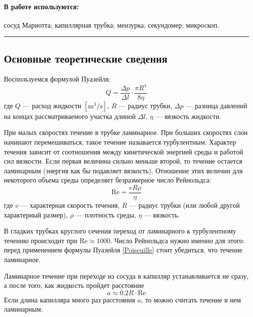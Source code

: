 \documentclass[a4paper,12pt]{report}
\newcommand{\re}{\text{Re}}
\begin{document}
        \paragraph*{В работе используются:} сосуд Мариотта; капиллярная трубка; мензурка; секундомер; микроскоп.
    \vspace{0.5cm}
    \hrule
    \begin{multicols}{2}
        \section{Основные теоретические сведения}
        Воспользуемся формулой Пуазейля:
        \begin{equation}
            \label{Poiseuille}
            Q=\frac{\Delta p}{\Delta l}\cdot \frac{\pi R^4}{8\eta}
        \end{equation}
        где $Q$ --- расход жидкости $[\text{m}^3/\text{s}]$, $R$ --- радиус трубки, $\Delta p$ --- разница давлений на концах рассматриваемого участка длиной $\Delta l$, $\eta$ --- вязкость жидкости.

        При малых скоростях течение в трубке ламинарное. При больших скоростях слои начинают перемешиваться, такое течение называется турбулентным. Характер течения зависит от соотношения между кинетической энергией среды и работой сил вязкости. Если первая величина сильно меньше второй, то течение остается ламинарным (энергия как бы подавляет вязкость). Отношение этих величин для некоторого объема среды определяет безразмерное число Рейнольдса:
        \begin{equation}
            \label{raynolds}
            \re=\frac{v R \rho}{\eta}
        \end{equation}
        где $v$ --- характерная скорость течения, $R$ --- радиус трубки (или любой другой характерный размер), $\rho$ --- плотность среды, $\eta$ --- вязкость. 

        В гладких трубках круглого сечения переход от ламинарного к турбулентному течению происходит при $\re\approx 1000$. Число Рейнольдса нужно именно для этого: перед применением формулы Пуазейля \eqref{Poiseuille} стоит убедиться, что течение ламинарное.

        Ламинарное течение при переходе из сосуда в капилляр устанавливается не сразу, а после того, как жидкость пройдет расстояние
        \begin{equation}
            \label{a}
            a\approx 0.2 R \cdot \re
        \end{equation}
        Если длина капилляра много раз расстояния $a$, то можно считать течение в нем ламинарным.
    \end{multicols}
\end{document}
